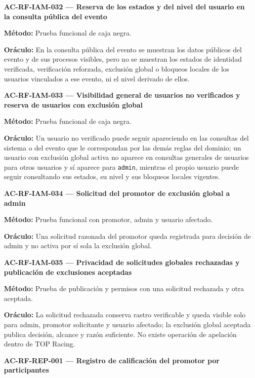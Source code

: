 \documentclass[10pt,letterpaper]{article}
\begin{document}
\noindent\textbf{AC-RF-IAM-032 --- Reserva de los estados y del nivel del usuario en la consulta pública del evento}\par
\textbf{Método:} Prueba funcional de caja negra.\par
\textbf{Oráculo:} En la consulta pública del evento se muestran los datos públicos del evento y de sus procesos visibles, pero no se muestran los estados de identidad verificada, verificación reforzada, exclusión global o bloqueos locales de los usuarios vinculados a ese evento, ni el nivel derivado de ellos.\par\vspace{0.45em}
\noindent\textbf{AC-RF-IAM-033 --- Visibilidad general de usuarios no verificados y reserva de usuarios con exclusión global}\par
\textbf{Método:} Prueba funcional de caja negra.\par
\textbf{Oráculo:} Un usuario no verificado puede seguir apareciendo en las consultas del sistema o del evento que le correspondan por las demás reglas del dominio; un usuario con exclusión global activa no aparece en consultas generales de usuarios para otros usuarios y sí aparece para \texttt{admin}, mientras el propio usuario puede seguir consultando sus estados, su nivel y sus bloqueos locales vigentes.\par\vspace{0.45em}
\noindent\textbf{AC-RF-IAM-034 --- Solicitud del promotor de exclusión global a admin}\par
\textbf{Método:} Prueba funcional con promotor, admin y usuario afectado.\par
\textbf{Oráculo:} Una solicitud razonada del promotor queda registrada para decisión de admin y no activa por sí sola la exclusión global.\par\vspace{0.45em}
\noindent\textbf{AC-RF-IAM-035 --- Privacidad de solicitudes globales rechazadas y publicación de exclusiones aceptadas}\par
\textbf{Método:} Prueba de publicación y permisos con una solicitud rechazada y otra aceptada.\par
\textbf{Oráculo:} La solicitud rechazada conserva rastro verificable y queda visible solo para admin, promotor solicitante y usuario afectado; la exclusión global aceptada publica decisión, alcance y razón suficiente. No existe operación de apelación dentro de TOP Racing.\par\vspace{0.45em}
\noindent\textbf{AC-RF-REP-001 --- Registro de calificación del promotor por participantes}\par
\end{document}
